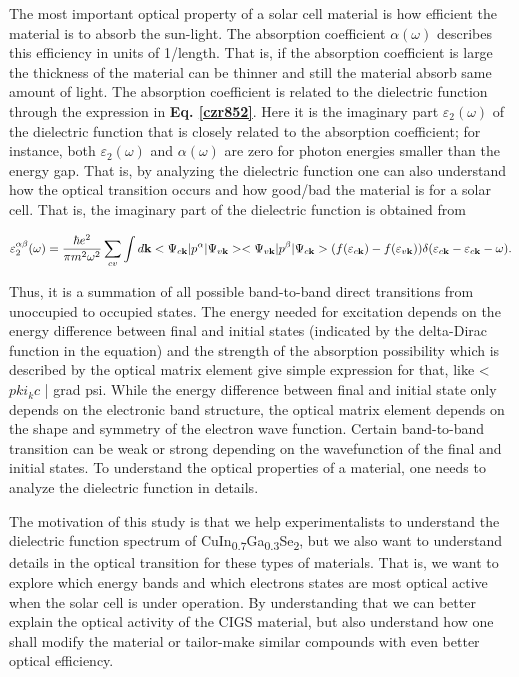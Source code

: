 \documentclass[a4paper, 12pt, titlepage,oneside,drop]{kthesis}
\begin{document}
\begin{enumerate}
The most important optical property of a solar cell material is how efficient the material is to absorb the sun-light. The absorption coefficient $\alpha(\omega)$ describes this efficiency in units of 1/length.
That is, if the absorption coefficient is large the thickness of the material can be thinner and still the material absorb same amount of light. The absorption coefficient is related to the dielectric function through
the expression in \textbf{Eq. \ref{czr852}}. Here it is the imaginary part $\varepsilon_2(\omega)$ of the dielectric function that is closely related to the absorption coefficient; for instance, 
both $\varepsilon_2(\omega)$ and $\alpha(\omega)$ are zero for photon energies smaller than the energy gap.  That is, by analyzing the dielectric function one can also understand how the optical transition occurs and
how good/bad the material is for a solar cell. That is, the imaginary part of the dielectric function is obtained from 

\begin{equation}
\varepsilon_2^{\alpha\beta} (\omega)= \frac{\hbar e^2}{\pi m^2\omega^2} \sum_{cv} \int d \textbf {k} <\Psi_{c{\textbf k}}|p^\alpha|\Psi_{v{\textbf k}}><\Psi_{v{\textbf k}}|p^\beta|\Psi_{c{\textbf k}}> (f(\varepsilon_{c \textbf k})-f(\varepsilon_{v \textbf k}))\delta(\varepsilon_{c {\textbf k}}-\varepsilon_{c{\textbf k}}-\omega).
\end{equation}

Thus, it is a summation of all possible band-to-band direct transitions from unoccupied to occupied states. The energy needed for excitation depends on the energy difference between final and initial states (indicated by the 
delta-Dirac function in the equation) and the strength of the absorption possibility which is described by the 
optical matrix element { give simple expression for that, like <$pki_kc$ |  grad   psi}. While the energy difference between final and initial state only depends on the electronic band structure, the optical matrix element depends
on the shape and symmetry of the electron wave function. Certain band-to-band transition can be weak or strong depending on the wavefunction of the final and initial states. To understand the optical properties of a material, 
one needs to analyze the dielectric function in details.  

 
\noindent The motivation of this study is that we help experimentalists to understand the dielectric function spectrum 
of CuIn\textsubscript{0.7}Ga\textsubscript{0.3}Se\textsubscript{2}, but we also want to understand details in the optical transition for these types of materials. That is, we want to explore which energy bands and which electrons states are 
most optical active when the solar cell is under operation. 
By understanding that we can better explain the optical activity of the CIGS material, but also understand how one shall modify the material or tailor-make similar compounds with even better optical efficiency.   



\end{enumerate}
\end{document}
